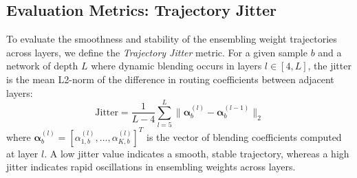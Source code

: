 \subsection{Evaluation Metrics: Trajectory Jitter}
To evaluate the smoothness and stability of the ensembling weight trajectories across layers, we define the \emph{Trajectory Jitter} metric. For a given sample $b$ and a network of depth $L$ where dynamic blending occurs in layers $l \in [4, L]$, the jitter is the mean L2-norm of the difference in routing coefficients between adjacent layers:
\begin{equation}
    \text{Jitter} = \frac{1}{L - 4} \sum_{l=5}^L \|\boldsymbol{\alpha}_b^{(l)} - \boldsymbol{\alpha}_b^{(l-1)}\|_2
\end{equation}
where $\boldsymbol{\alpha}_b^{(l)} = [\alpha_{1, b}^{(l)}, \dots, \alpha_{K, b}^{(l)}]^T$ is the vector of blending coefficients computed at layer $l$. A low jitter value indicates a smooth, stable trajectory, whereas a high jitter indicates rapid oscillations in ensembling weights across layers.
